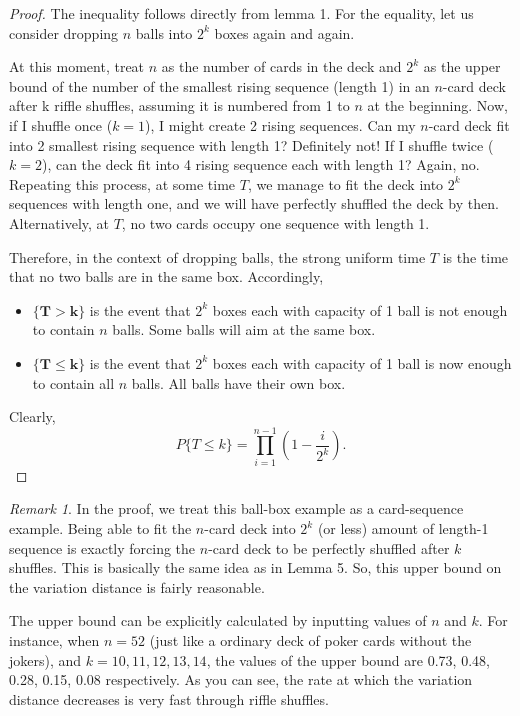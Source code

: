 \documentclass[12pt]{article}
\theoremstyle{plain}
\theoremstyle{definition}
\theoremstyle{remark}
\newtheorem*{remark}{Remark}
\begin{document}
\begin{proof}
The inequality follows directly from lemma 1. For the equality, let us consider dropping $n$ balls into $2^k$ boxes again and again. 

At this moment, treat $n$ as the number of cards in the deck and $2^k$ as the upper bound of the number of the smallest rising sequence (length 1) in an $n$-card deck after k riffle shuffles, assuming it is numbered from 1 to $n$ at the beginning. Now, if I shuffle once ($k=1$), I might create 2 rising sequences. Can my $n$-card deck fit into 2 smallest rising sequence with length 1? Definitely not! If I shuffle twice ($k=2$), can the deck fit into 4 rising sequence each with length 1? Again, no. Repeating this process, at some time $T$, we manage to fit the deck into $2^k$ sequences with length one, and we will have perfectly shuffled the deck by then. Alternatively, at $T$, no two cards occupy one sequence with length 1.

Therefore, in the context of dropping balls, the strong uniform time $T$  is the time that no two balls are in the same box.  Accordingly,
\begin{itemize}
    \item $\mathbf{\{T>k\}}$ is the event that $2^k$ boxes each with capacity of 1 ball is not enough to contain $n$ balls. Some balls will aim at the same box. 
    \item $\mathbf{\{T\leq k\}}$ is the event that $2^k$ boxes each with capacity of 1 ball is now enough to contain all $n$ balls. All balls have their own box.
\end{itemize}

Clearly, $$P\{T\leq k\}=\prod_{i=1}^{n-1}(1-\frac{i}{2^k}).$$
\end{proof}

\begin{remark}
In the proof, we treat this ball-box example as a card-sequence example. Being able to fit the $n$-card deck into $2^k$ (or less) amount of length-1 sequence is exactly forcing the $n$-card deck to be perfectly shuffled after $k$ shuffles. This is basically the same idea as in Lemma 5. So, this upper bound on the variation distance is fairly reasonable.
\end{remark}

The upper bound can be explicitly calculated by inputting values of $n$ and $k$. For instance\cite[344]{1.1}, when $n=52$ (just like a ordinary deck of poker cards without the jokers), and $k=10, 11, 12, 13, 14$, the values of the upper bound are 0.73, 0.48, 0.28, 0.15, 0.08 respectively. As you can see, the rate at which the variation distance decreases is very fast through riffle shuffles. 
\end{document}
